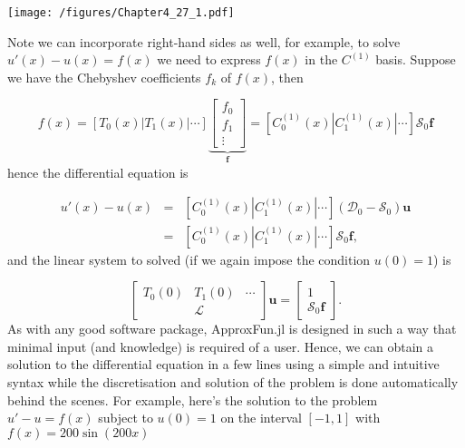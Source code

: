 \documentclass[12pt,landscape]{article}
\begin{document}
{\texttt{[image: /figures/Chapter4\_27\_1.pdf]}

Note we can incorporate right-hand sides as well, for example, to solve $u'(x) - u(x) = f(x)$ we need to express $f(x)$ in the $C^{(1)}$ basis.  Suppose we have the Chebyshev coefficients $f_k$ of $f(x)$, then

\[
f(x) = \left[ T_0(x) | T_1(x) | \cdots \right]\underbrace{\begin{bmatrix} f_0 \\
f_1 \\
 \vdots \end{bmatrix}}_{\mathbf{f}} =  \left[ C_0^{(1)}(x) | C_1^{(1)}(x) | \cdots \right]\mathcal{S}_0 \mathbf{f} 
\]
hence the differential equation is


\begin{eqnarray*}
u'(x)-u(x) &=&  \left[ C_0^{(1)}(x) | C_1^{(1)}(x) | \cdots \right]\left(\mathcal{D}_0 - \mathcal{S}_0\right)\mathbf{u}\\
 &=& \left[ C_0^{(1)}(x) | C_1^{(1)}(x) | \cdots \right]\mathcal{S}_0\mathbf{f},
\end{eqnarray*}
and the linear system to solved (if we again impose the condition $u(0) = 1$) is

\[
\begin{bmatrix}
T_0(0) & T_1(0) & \cdots  \\
 &\mathcal{L} &
\end{bmatrix}\mathbf{u} = \begin{bmatrix} 1 \\
\mathcal{S}_0\mathbf{f}
\end{bmatrix}.
\]
As with any good software package, ApproxFun.jl is designed in such a way that minimal input (and knowledge) is required of a user.  Hence, we can obtain a solution to the differential equation  in a few lines using a simple and intuitive syntax while the discretisation and solution of the problem is done automatically behind the scenes.  For example, here's the solution to the problem $u' - u = f(x)$ subject to $u(0) = 1$ on the interval $[-1, 1]$ with $f(x) = 200\sin(200x)$


}
\end{document}

